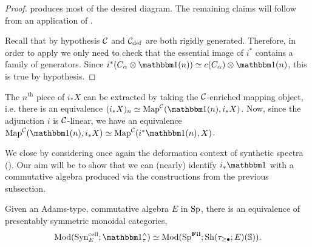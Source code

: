 \begin{proof}
   produces most of the desired diagram.
  The remaining claims will follow from an application of .

  Recall that by hypothesis $\mathcal{C}$ and $\mathcal{C}_{\mathrm{def}}$ are both rigidly generated.
  Therefore, in order to apply  we only need to check that the essential image of $i^*$ contains a family of generators.
  Since $i^*(C_\alpha \otimes \o(n)) \simeq c(C_\alpha) \otimes \o(n)$, this is true by hypothesis.
\end{proof}

\begin{rmk} \label{rmk:i-lower-hom}
  The $n^{\mathrm{th}}$ piece of $i_*X$ can be extracted by taking the $\mathcal{C}$-enriched mapping object,
  i.e. there is an equivalence $ (i_*X)_n \simeq \Map^{\CC}( \o(n), i_*X ) $.
  Now, since the adjunction $i$ is $\mathcal{C}$-linear, we have an equivalence $\Map^{\CC}( \o(n), i_*X) \simeq \Map^{\CC}( i^*\o(n), X)$.
\end{rmk}

We close by considering once again the deformation context of synthetic spectra (). Our aim will be to show that we can (nearly) identify $i_*\o$ with a commutative algebra produced via the constructions from the previous subsection.

\begin{prop}\label{prop:syn-to-fil}
  Given an Adams-type, commutative algebra $E$ in $\operatorname{\mathrm{Sp}}$,
  there is an equivalence of presentably symmetric monoidal categories,
  \[ \Mod( \Syn_E^{\cell} ; \o_\tau^{\wedge} ) \simeq \Mod( \Sp^{\Fil} ; \mathrm{Sh}(\tau_{\geq \bullet} ; E)(\Ss)). \]
\end{prop}
   
